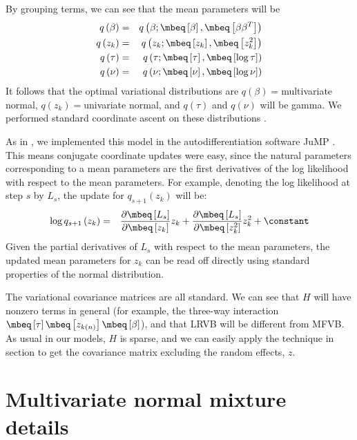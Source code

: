 %
By grouping terms, we can see that the mean parameters will be
%
\begin{eqnarray*}
q\left(\beta\right) & = & q\left(\beta;\mbeq\left[\beta\right],\mbeq\left[\beta\beta^{T}\right]\right)\\
q\left(z_{k}\right) & = & q\left(z_{k};\mbeq\left[z_{k}\right],\mbeq\left[z_{k}^{2}\right]\right)\\
q\left(\tau\right) & = & q\left(\tau;\mbeq\left[\tau\right],\mbeq\left[\log\tau\right]\right)\\
q\left(\nu\right) & = & q\left(\nu;\mbeq\left[\nu\right],\mbeq\left[\log\nu\right]\right)
\end{eqnarray*}
%
It follows that the optimal variational distributions are $q\left(\beta\right)=$multivariate
normal, $q\left(z_{k}\right)=$univariate normal, and $q\left(\tau\right)$
and $q\left(\nu\right)$ will be gamma. We performed standard coordinate
ascent on these distributions \cite{bishop:2006:pattern}.

As in , we implemented this model in the
autodifferentiation software JuMP \cite{JuMP:LubinDunningIJOC}.
This means conjugate coordinate updates were easy, since the natural
parameters corresponding to a mean parameters are the first derivatives
of the log likelihood with respect to the mean parameters. For example,
denoting the log likelihood at step $s$ by $L_{s}$, the update for
$q_{s+1}\left(z_{k}\right)$ will be:
%
\begin{eqnarray*}
\log q_{s+1}\left(z_{k}\right) & = & \frac{\partial\mbeq\left[L_{s}\right]}{\partial\mbeq\left[z_{k}\right]}z_{k}+\frac{\partial\mbeq\left[L_{s}\right]}{\partial\mbeq\left[z_{k}^{2}\right]}z_{k}^{2}+\constant
\end{eqnarray*}
%
Given the partial derivatives of $L_{s}$ with respect to the mean
parameters, the updated mean parameters for $z_{k}$ can be read off
directly using standard properties of the normal distribution.

The variational covariance matrices are all standard. We can see that
$H$ will have nonzero terms in general (for example, the three-way
interaction $\mbeq\left[\tau\right]\mbeq\left[z_{k\left(n\right)}\right]\mbeq\left[\beta\right]$),
and that LRVB will be different from MFVB. As usual in our models,
$H$ is sparse, and we can easily apply the technique in section 
to get the covariance matrix excluding the random effects, $z$.

\section{Multivariate normal mixture details} \label{app:mvn_details}

